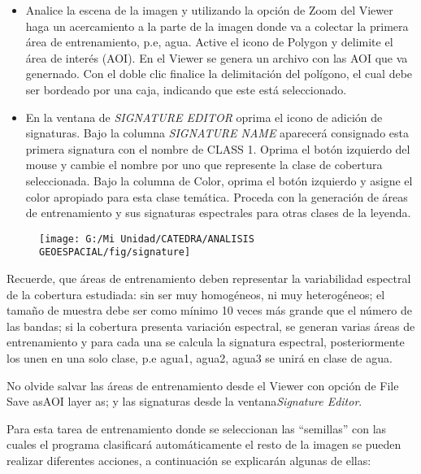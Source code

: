 \documentclass[a4paper,oneside,11pt,]{article}
\begin{document}
\begin{itemize}
\item Analice la escena de la imagen y utilizando la opción de Zoom del Viewer haga un acercamiento a la parte de la imagen donde va a colectar la primera área de entrenamiento, p.e, agua. Active el icono de Polygon    y delimite el área de interés (AOI). En el Viewer se genera un archivo con las AOI que va genernado. Con el doble clic  finalice la delimitación del polígono, el cual debe ser bordeado por una caja, indicando que este está seleccionado.
\item En la ventana de \emph{SIGNATURE EDITOR} oprima el icono   de adición de signaturas. Bajo la columna \emph{SIGNATURE NAME} aparecerá consignado esta primera signatura con el nombre de CLASS 1. Oprima el botón izquierdo del mouse y cambie el nombre por uno que represente la clase de cobertura seleccionada.  Bajo la columna de Color, oprima el botón izquierdo y asigne el color apropiado para esta clase temática. Proceda con la generación de áreas de entrenamiento y sus signaturas  espectrales para otras clases de la leyenda.
\end{itemize}

\begin{figure}
\centering
\texttt{[image: G:/Mi Unidad/CATEDRA/ANALISIS GEOESPACIAL/fig/signature]}
\end{figure}

Recuerde, que áreas de entrenamiento deben representar la variabilidad espectral de la cobertura estudiada: sin ser muy homogéneos, ni muy heterogéneos; el tamaño de muestra debe ser como mínimo 10 veces más grande que el número de las bandas; si la cobertura presenta variación espectral, se generan varias áreas de entrenamiento y para cada una se calcula la signatura espectral,  posteriormente los unen en una solo clase, p.e agua1, agua2, agua3 se unirá en clase de agua.
\par No olvide salvar las áreas de entrenamiento desde el Viewer con opción de File \textrightarrow Save as\textrightarrow AOI layer as;  y las signaturas desde la ventana\emph{Signature Editor}.
\par Para esta tarea de entrenamiento donde se seleccionan las “semillas” con las cuales el programa clasificará automáticamente el resto de la imagen se pueden realizar diferentes acciones, a continuación se explicarán algunas de ellas:
\end{document}
